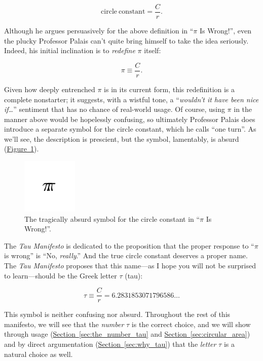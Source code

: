\documentclass{article}
\begin{document}
\[
  \mathrm{circle\ constant} = \frac{C}{r}.
\]

Although he argues persuasively for the above definition in ``$\pi$ Is Wrong!'', even the plucky Professor Palais can't quite bring himself to take the idea seriously. Indeed, his initial inclination is to \emph{redefine} $\pi$ itself:

\[
  \pi \equiv \frac{C}{r}.
\]

\noindent Given how deeply entrenched $\pi$ is in its current form, this redefinition is a complete nonstarter; it suggests, with a wistful tone, a ``\emph{wouldn't it have been nice if\ldots}'' sentiment that has no chance of real-world usage. Of course, using $\pi$ in the manner above would be hopelessly confusing, so ultimately Professor Palais does introduce a separate symbol for the circle constant, which he calls ``one turn''.  As we'll see, the description is prescient, but the symbol, lamentably, is absurd (\hyperref[fig:palais-tau]{Figure~}\ref{fig:palais-tau}).

\begin{figure}
\begin{center}
\includegraphics{images/figures/palais-tau.png}
\end{center}
\caption{The tragically absurd symbol for the circle constant in ``$\pi$ Is Wrong!''.\label{fig:palais-tau}}
\end{figure}

The \emph{Tau Manifesto} is dedicated to the proposition that the proper response to ``$\pi$ is wrong'' is ``No, \emph{really}.'' And the true circle constant deserves a proper name. The \emph{Tau Manifesto} proposes that this name---as I hope you will not be surprised to learn---should be the Greek letter $\tau$ (tau):

\[
  \tau \equiv \frac{C}{r} = 6.2831853071796586\ldots
\]

\noindent This symbol is neither confusing nor absurd. Throughout the rest of this manifesto, we will see that the \emph{number} $\tau$ is the correct choice, and we will show through usage (\hyperref[sec:the_number_tau]{Section~}\ref{sec:the_number_tau} and \hyperref[sec:circular_area]{Section~}\ref{sec:circular_area}) and by direct argumentation (\hyperref[sec:why_tau]{Section~}\ref{sec:why_tau}) that the \emph{letter} $\tau$ is a natural choice as well.
\end{document}
